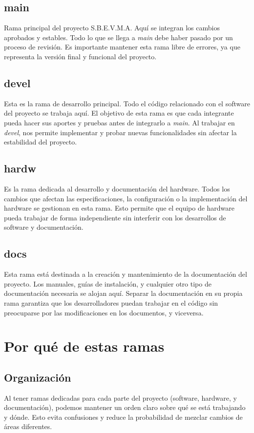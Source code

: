 \documentclass[a4paper]{article}
\begin{document}
    \subsection{main}
        \indent Rama principal del proyecto S.B.E.V.M.A. Aquí se integran los cambios aprobados y estables. Todo lo que se llega a \textit{main} debe haber pasado por un proceso de revisión. Es importante mantener esta rama libre de errores, ya que representa la versión final y funcional del proyecto.

    \subsection{devel}
        \indent Esta es la rama de desarrollo principal. Todo el código relacionado con el software del proyecto se trabaja aquí. El objetivo de esta rama es que cada integrante pueda hacer sus aportes y pruebas antes de integrarlo a \textit{main}. Al trabajar en \textit{devel}, nos permite implementar y probar nuevas funcionalidades sin afectar la estabilidad del proyecto.

    \subsection{hardw}
        \indent Es la rama dedicada al desarrollo y documentación del hardware. Todos los cambios que afectan las especificaciones, la configuración o la implementación del hardware se gestionan en esta rama. Esto permite que el equipo de hardware pueda trabajar de forma independiente sin interferir con los desarrollos de software y documentación.

    \subsection{docs}
        \indent Esta rama está destinada a la creación y mantenimiento de la documentación del proyecto. Los manuales, guías de instalación, y cualquier otro tipo de documentación necesaria se alojan aquí. Separar la documentación en su propia rama garantiza que los desarrolladores puedan trabajar en el código sin preocuparse por las modificaciones en los documentos, y viceversa.

\section{Por qué de estas ramas}

    \subsection{Organización}
    \indent Al tener ramas dedicadas para cada parte del proyecto (software, hardware, y documentación), podemos mantener un orden claro sobre qué se está trabajando y dónde. Esto evita confusiones y reduce la probabilidad de mezclar cambios de áreas diferentes.
\end{document}
